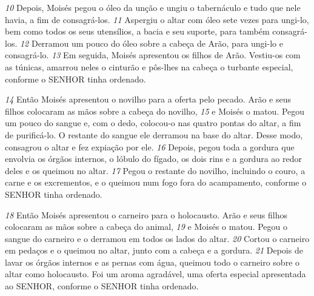 \bigskip
\textit{\tiny 10}
Depois, Moisés pegou o óleo da unção e ungiu o tabernáculo e tudo que nele
havia, a fim de consagrá-los. 
\textit{\tiny 11}
Aspergiu o altar com óleo sete vezes para ungi-lo,
bem como todos os seus utensílios, a bacia e seu suporte, para também consagrá-
los. 
\textit{\tiny 12}
Derramou um pouco do óleo sobre a cabeça de Arão, para ungi-lo e
consagrá-lo. 
\textit{\tiny 13}
Em seguida, Moisés apresentou os filhos de Arão. Vestiu-os com as
túnicas, amarrou neles o cinturão e pôs-lhes na cabeça o turbante especial,
conforme o SENHOR tinha ordenado.
   
\bigskip
\textit{\tiny 14}
Então Moisés apresentou o novilho para a oferta pelo pecado. Arão e seus
filhos colocaram as mãos sobre a cabeça do novilho, 
\textit{\tiny 15}
e Moisés o matou. Pegou
um pouco do sangue e, com o dedo, colocou-o nas quatro pontas do altar, a fim de
purificá-lo. O restante do sangue ele derramou na base do altar. Desse modo,
consagrou o altar e fez expiação por ele.
\textit{\tiny 16}
Depois, pegou toda a gordura que
envolvia os órgãos internos, o lóbulo do fígado, os dois rins e a gordura ao redor
deles e os queimou no altar. 
\textit{\tiny 17}
Pegou o restante do novilho, incluindo o couro, a
carne e os excrementos, e o queimou num fogo fora do acampamento, conforme
o SENHOR tinha ordenado.
   
\bigskip
\textit{\tiny 18}
Então Moisés apresentou o carneiro para o holocausto. Arão e seus filhos
colocaram as mãos sobre a cabeça do animal, 
\textit{\tiny 19}
e Moisés o matou. Pegou o sangue
do carneiro e o derramou em todos os lados do altar. 
\textit{\tiny 20}
Cortou o carneiro em
pedaços e o queimou no altar, junto com a cabeça e a gordura. 
\textit{\tiny 21}
Depois de lavar
os órgãos internos e as pernas com água, queimou todo o carneiro sobre o altar
como holocausto. Foi um aroma agradável, uma oferta especial apresentada ao
SENHOR, conforme o SENHOR tinha ordenado.
   
